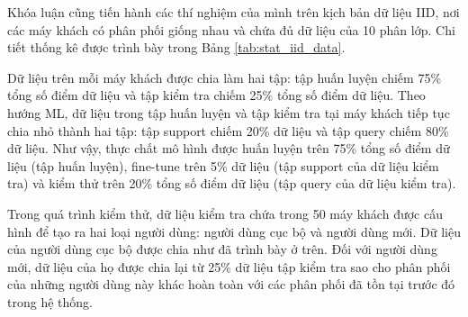 Khóa luận cũng tiến hành các thí nghiệm của mình trên kịch bản dữ liệu IID, nơi các máy khách có phân phối giống nhau và chứa đủ dữ liệu của 10 phân lớp. Chi tiết thống kê được trình bày trong Bảng \ref{tab:stat_iid_data}.

\begin{table}[H]
    \caption{Thống kê trên hai tập dữ liệu MNIST và CIFAR-10 (dữ liệu IID)}
    \label{tab:stat_iid_data}
\end{table}

Dữ liệu trên mỗi máy khách được chia làm hai tập: tập huấn luyện chiếm 75\% tổng số điểm dữ liệu và tập kiểm tra chiếm 25\% tổng số điểm dữ liệu. Theo hướng ML, dữ liệu trong tập huấn luyện và tập kiểm tra tại máy khách tiếp tục chia nhỏ thành hai tập: tập support chiếm 20\% dữ liệu và tập query chiếm 80\% dữ liệu. Như vậy, thực chất mô hình được huấn luyện trên 75\% tổng số điểm dữ liệu (tập huấn luyện), fine-tune trên 5\% dữ liệu (tập support của dữ liệu kiểm tra) và kiểm thử trên 20\% tổng số điểm dữ liệu (tập query của dữ liệu kiểm tra).

Trong quá trình kiểm thử, dữ liệu kiểm tra chứa trong 50 máy khách được cấu hình để tạo ra hai loại người dùng: người dùng cục bộ và người dùng mới. Dữ liệu của người dùng cục bộ được chia như đã trình bày ở trên. Đối với người dùng mới, dữ liệu của họ được chia lại từ 25\% dữ liệu tập kiểm tra sao cho phân phối của những người dùng này khác hoàn toàn với các phân phối đã tồn tại trước đó trong hệ thống.

